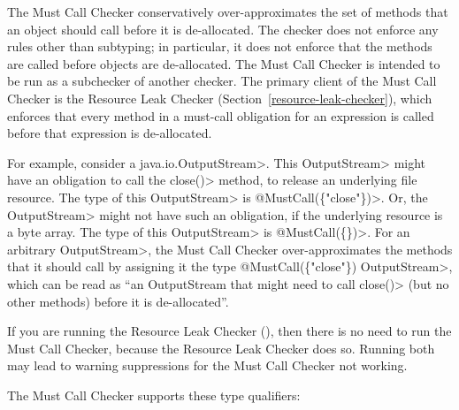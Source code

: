 \htmlhr
{}

The Must Call Checker conservatively over-approximates
the set of methods that an object should call before it is de-allocated.
The checker does not enforce any rules other than subtyping;
in particular, it does not enforce that the methods are called before
objects are de-allocated.
The Must Call Checker is intended to be run as a subchecker of another checker.
The primary client
of the Must Call Checker is the Resource Leak Checker (Section~\ref{resource-leak-checker}),
which enforces that every method in a must-call obligation for an expression is called
before that expression is de-allocated.

For example, consider a \<java.io.OutputStream>.  This \<OutputStream>
might have an obligation to call the \<close()> method, to release an
underlying file resource. The type of this \<OutputStream> is
\<@MustCall(\{"close"\})>.  Or, the \<OutputStream> might not have such an
obligation, if the underlying resource is a byte array. The type of this
\<OutputStream> is \<@MustCall(\{\})>.
For an arbitrary \<OutputStream>, the Must Call
Checker over-approximates the methods that it should call by assigning it
the type \<@MustCall(\{"close"\}) OutputStream>, which can be read as ``an
OutputStream that might need to call \<close()> (but no other methods)
before it is de-allocated''.

If you are running the Resource Leak Checker
(), then there is no need to run the
Must Call Checker, because the Resource Leak Checker does so.
Running both may lead to warning suppressions for the Must Call Checker not
working.



The Must Call Checker supports these type qualifiers:

